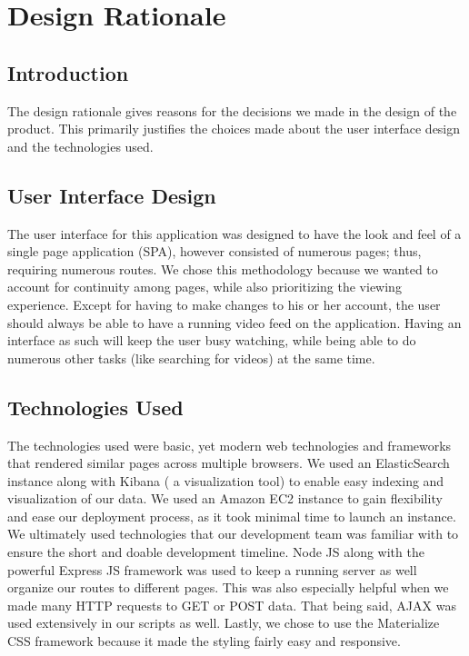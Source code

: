 \chapter{Design Rationale}

\section{Introduction}
	The design rationale gives reasons for the decisions we made in the design of the product. This primarily justifies the choices made about the user interface design and the technologies used.
    
\section{User Interface Design}
	The user interface for this application was designed to have the look and feel of a single page application (SPA), however consisted of numerous pages; thus, requiring numerous routes. We chose this methodology because we wanted to account for continuity among pages, while also prioritizing the viewing experience. Except for having to make changes to his or her account, the user should always be able to have a running video feed on the application. Having an interface as such will keep the user busy watching, while being able to do numerous other tasks (like searching for videos) at the same time. 

\section{Technologies Used}
	The technologies used were basic, yet modern web technologies and frameworks that rendered similar pages across multiple browsers. We used an ElasticSearch instance along with Kibana ( a visualization tool) to enable easy indexing and visualization of our data. We used an Amazon EC2 instance to gain flexibility and ease our deployment process, as it took minimal time to launch an instance. We ultimately used technologies that our development team was familiar with to ensure the short and doable development timeline. Node JS along with the powerful Express JS framework was used to keep a running server as well organize our routes to different pages. This was also  especially helpful when we made many HTTP requests to GET or POST data. That being said, AJAX was used extensively in our scripts as well. Lastly, we chose to use the Materialize CSS framework because it made the styling fairly easy and responsive.